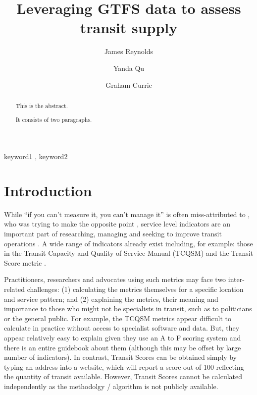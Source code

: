 \documentclass[preprint, 3p,
authoryear]{elsarticle} %
\begin{document}
\begin{frontmatter}

  \title{Leveraging GTFS data to assess transit supply}
    \author[Public Transport Research Group (PTRG)]{James Reynolds%
  }
    \author[Public Transport Research Group (PTRG)]{Yanda Qu%
  }
    \author[Public Transport Research Group (PTRG)]{Graham Currie%
  }
  
  \begin{abstract}
  This is the abstract.

  It consists of two paragraphs.
  \end{abstract}
    \begin{keyword}
    keyword1 \sep 
    keyword2
  \end{keyword}
  
 \end{frontmatter}

\hypertarget{introduction}{%
\section{Introduction}\label{introduction}}

While ``if you can't measure it, you can't manage it'' is often
miss-attributed to \citet{Deming1993new}, who was trying to make the
opposite point \citep{Berenson2016in}, service level indicators are an
important part of researching, managing and seeking to improve transit
operations \citep{FieldingGordonJ1987Mpts, Ryus:2003aa}. A wide range of
indicators already exist including, for example: those in the Transit
Capacity and Quality of Service Manual (TCQSM)\citep{TCQSM:2013} and the
Transit Score metric \citep{WalkScore:2023tg}.

Practitioners, researchers and advocates using such metrics may face two
inter-related challenges: (1) calculating the metrics themselves for a
specific location and service pattern; and (2) explaining the metrics,
their meaning and importance to those who might not be specialists in
transit, such as to politicians or the general public. For example, the
TCQSM metrics appear difficult to calculate in practice without access
to specialist software and data. But, they appear relatively easy to
explain given they use an A to F scoring system and there is an entire
guidebook about them (although this may be offset by large number of
indicators). In contrast, Transit Scores can be obtained simply by
typing an address into a website, which will report a score out of 100
reflecting the quantity of transit available. However, Transit Scores
cannot be calculated independently as the methodolgy / algorithm is not
publicly available.
\end{document}
